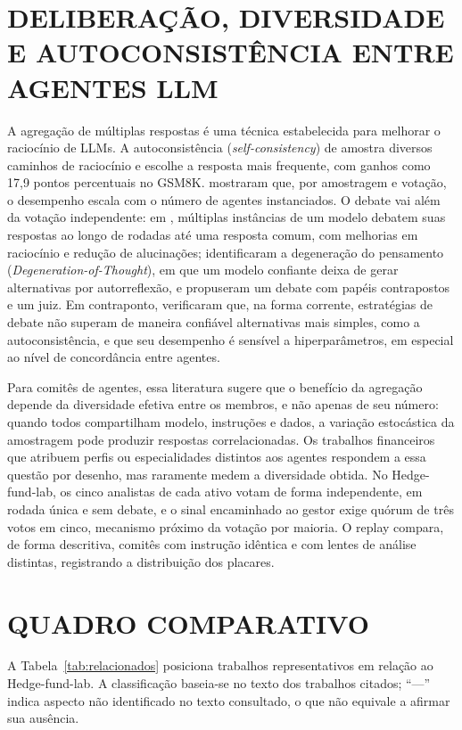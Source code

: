 \documentclass{eic-bcc-tcc}
\begin{document}
\section{DELIBERAÇÃO, DIVERSIDADE E AUTOCONSISTÊNCIA ENTRE AGENTES LLM}

A agregação de múltiplas respostas é uma técnica estabelecida para melhorar o raciocínio de LLMs. A autoconsistência (\textit{self-consistency}) de \citet{Wang2023} amostra diversos caminhos de raciocínio e escolhe a resposta mais frequente, com ganhos como 17,9 pontos percentuais no GSM8K. \citet{Li2024} mostraram que, por amostragem e votação, o desempenho escala com o número de agentes instanciados. O debate vai além da votação independente: em \citet{Du2024}, múltiplas instâncias de um modelo debatem suas respostas ao longo de rodadas até uma resposta comum, com melhorias em raciocínio e redução de alucinações; \citet{Liang2024} identificaram a degeneração do pensamento (\textit{Degeneration-of-Thought}), em que um modelo confiante deixa de gerar alternativas por autorreflexão, e propuseram um debate com papéis contrapostos e um juiz. Em contraponto, \citet{Smit2024} verificaram que, na forma corrente, estratégias de debate não superam de maneira confiável alternativas mais simples, como a autoconsistência, e que seu desempenho é sensível a hiperparâmetros, em especial ao nível de concordância entre agentes.

Para comitês de agentes, essa literatura sugere que o benefício da agregação depende da diversidade efetiva entre os membros, e não apenas de seu número: quando todos compartilham modelo, instruções e dados, a variação estocástica da amostragem pode produzir respostas correlacionadas. Os trabalhos financeiros que atribuem perfis ou especialidades distintos aos agentes \citep{Li2023, Xing2024, TradingAgents2024} respondem a essa questão por desenho, mas raramente medem a diversidade obtida. No Hedge-fund-lab, os cinco analistas de cada ativo votam de forma independente, em rodada única e sem debate, e o sinal encaminhado ao gestor exige quórum de três votos em cinco, mecanismo próximo da votação por maioria. O replay compara, de forma descritiva, comitês com instrução idêntica e com lentes de análise distintas, registrando a distribuição dos placares.

\section{QUADRO COMPARATIVO}

A Tabela~\ref{tab:relacionados} posiciona trabalhos representativos em relação ao Hedge-fund-lab. A classificação baseia-se no texto dos trabalhos citados; ``---'' indica aspecto não identificado no texto consultado, o que não equivale a afirmar sua ausência.
\end{document}
